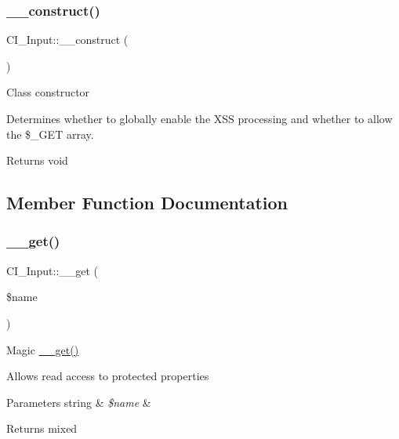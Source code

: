 \subsubsection{\texorpdfstring{\+\_\+\+\_\+construct()}{\_\_construct()}}
{\footnotesize\ttfamily C\+I\+\_\+\+Input\+::\+\_\+\+\_\+construct (\begin{DoxyParamCaption}{ }\end{DoxyParamCaption})}

Class constructor

Determines whether to globally enable the X\+SS processing and whether to allow the \$\+\_\+\+G\+ET array.

\begin{DoxyReturn}{Returns}
void 
\end{DoxyReturn}


\subsection{Member Function Documentation}
\mbox{\label{class_c_i___input_a17440316cc4bfe2790979c6f5c87f97e}} 
\subsubsection{\texorpdfstring{\+\_\+\+\_\+get()}{\_\_get()}}
{\footnotesize\ttfamily C\+I\+\_\+\+Input\+::\+\_\+\+\_\+get (\begin{DoxyParamCaption}\item[{}]{\$name }\end{DoxyParamCaption})}

Magic \mbox{\hyperlink{class_c_i___input_a17440316cc4bfe2790979c6f5c87f97e}{\+\_\+\+\_\+get()}}

Allows read access to protected properties


\begin{DoxyParams}[1]{Parameters}
string & {\em \$name} & \\
\hline
\end{DoxyParams}
\begin{DoxyReturn}{Returns}
mixed 
\end{DoxyReturn}
\mbox{\label{class_c_i___input_afe5d3f26bbdb3239c38a00577ff435c1}} 
